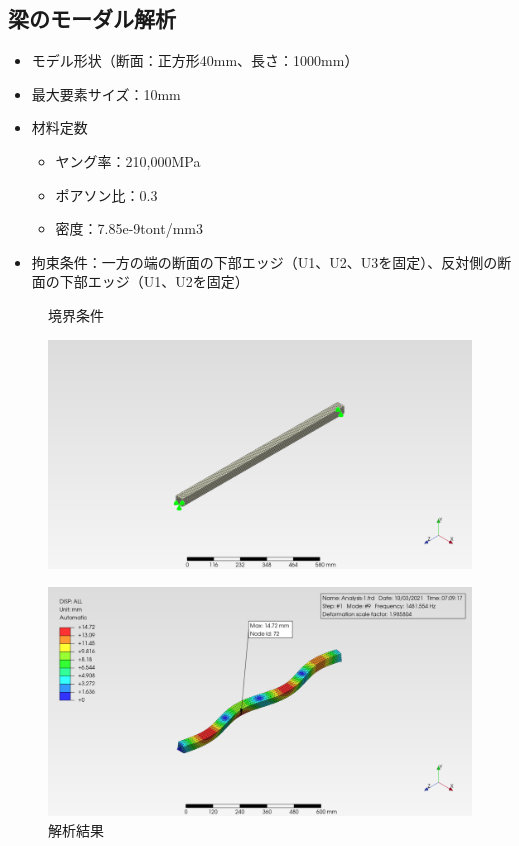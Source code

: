 \documentclass[a4j,20pt,slide]{ltjsarticle}
\begin{document}
\subsection{梁のモーダル解析}
\begin{itemize}
	\item モデル形状（断面：正方形40mm、長さ：1000mm）
	\item 最大要素サイズ：10mm
	\item 材料定数
	      \begin{itemize}
		      \item ヤング率：210,000MPa
		      \item ポアソン比：0.3
		      \item 密度：7.85e-9tont/mm3
	      \end{itemize}
	\item 拘束条件：一方の端の断面の下部エッジ（U1、U2、U3を固定）、反対側の断面の下部エッジ（U1、U2を固定）
\end{itemize}
\vspace{-\baselineskip}
\begin{figure}[H]
	\begin{minipage}{.49\hsize}
		\caption{境界条件}
		\label{06-01}
		\centering
		\includegraphics[width=.95\columnwidth]{fig/06-01.png}
	\end{minipage}
	\begin{minipage}{.49\hsize}
		\caption{解析結果}
		\label{06-02}
		\centering
		\includegraphics[width=.95\columnwidth]{fig/06-02.png}
	\end{minipage}
\end{figure}
\clearpage
%
\end{document}

